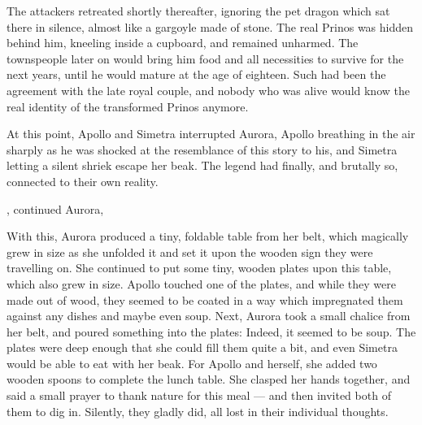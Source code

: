 The attackers retreated shortly thereafter, ignoring the pet dragon which sat there in silence, almost like a gargoyle made of stone. The real Prinos was hidden behind him, kneeling inside a cupboard, and remained unharmed. The townspeople later on would bring him food and all necessities to survive for the next years, until he would mature at the age of eighteen. Such had been the agreement with the late royal couple, and nobody who was alive would know the real identity of the transformed Prinos anymore.

\fancybreaker{}

At this point, Apollo and Simetra interrupted Aurora, Apollo breathing in the air sharply as he was shocked at the resemblance of this story to his, and Simetra letting a silent shriek escape her beak. The legend had finally, and brutally so, connected to their own reality.

, continued Aurora, 

With this, Aurora produced a tiny, foldable table from her belt, which magically grew in size as she unfolded it and set it upon the wooden sign they were travelling on. She continued to put some tiny, wooden plates upon this table, which also grew in size. Apollo touched one of the plates, and while they were made out of wood, they seemed to be coated in a way which impregnated them against any dishes and maybe even soup. Next, Aurora took a small chalice from her belt, and poured something into the plates: Indeed, it seemed to be soup. The plates were deep enough that she could fill them quite a bit, and even Simetra would be able to eat with her beak. For Apollo and herself, she added two wooden spoons to complete the lunch table. She clasped her hands together, and said a small prayer to thank nature for this meal --- and then invited both of them to dig in. Silently, they gladly did, all lost in their individual thoughts.
